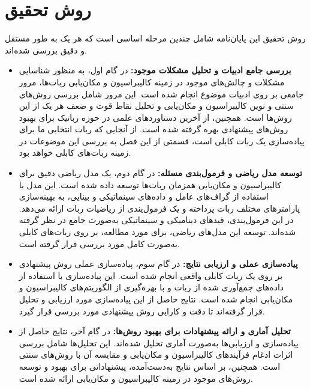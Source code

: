 \section{روش تحقیق}
 روش تحقیق این پایان‌نامه شامل چندین مرحله اساسی است که هر یک به طور مستقل و دقیق بررسی شده‌اند. 
\begin{itemize}
	
	\item \textbf{بررسی جامع ادبیات و تحلیل مشکلات موجود:} در گام اول، به منظور شناسایی مشکلات و چالش‌های موجود در زمینه کالیبراسیون و مکان‌یابی ربات‌ها، مرور جامعی بر روی ادبیات موضوع انجام شده است. این مرور شامل بررسی روش‌های سنتی و نوین کالیبراسیون و مکان‌یابی و تحلیل نقاط قوت و ضعف هر یک از این روش‌ها است. همچنین، از آخرین دستاوردهای علمی در حوزه رباتیک برای بهبود روش‌های پیشنهادی بهره گرفته شده است. از آنجایی که ربات انتخابی ما برای پیاده‌سازی یک ربات کابلی است، قسمتی از این فصل به بررسی این موضوعات در زمینه ربات‌های کابلی خواهد بود.
	
	\item \textbf{توسعه مدل ریاضی و فرمول‌بندی مسئله:}
در گام دوم، یک مدل ریاضی دقیق برای کالیبراسیون و مکان‌یابی همزمان ربات‌ها توسعه داده شده است. این مدل با استفاده از گراف‌های عامل و داده‌های سینماتیکی و بینایی، به بهینه‌سازی پارامترهای مختلف ربات پرداخته و یک فرمول‌یندی از ریاضیات ربات ارائه می‌دهد. در این فرمول‌بندی، قیدهای دینامیکی و سینماتیکی به‌صورت جامع در نظر گرفته شده‌اند. توسعه این مدل‌های ریاضی، برای مورد مطالعه، بر روی ربات‌های کابلی به‌صورت کامل مورد بررسی قرار گرفته است.
	
	\item \textbf{پیاده‌سازی عملی و ارزیابی نتایج:} در گام سوم، پیاده‌سازی عملی روش پیشنهادی بر روی یک ربات کابلی واقعی انجام شده است. این پیاده‌سازی با استفاده از داده‌های جمع‌آوری شده از ربات و با بهره‌گیری از الگوریتم‌های کالیبراسیون و مکان‌یابی انجام شده است. نتایج حاصل از این پیاده‌سازی مورد ارزیابی و تحلیل قرار گرفته‌اند تا دقت و کارایی روش پیشنهادی مورد بررسی قرار گیرد.
	
	\item \textbf{تحلیل آماری و ارائه پیشنهادات برای بهبود روش‌ها:} در گام آخر، نتایج حاصل از پیاده‌سازی و ارزیابی‌ها به‌صورت آماری تحلیل شده‌اند. این تحلیل‌ها شامل بررسی اثرات ادغام فرآیندهای کالیبراسیون و مکان‌یابی و مقایسه آن با روش‌های سنتی است. همچنین، بر اساس نتایج به‌دست‌آمده، پیشنهاداتی برای بهبود و توسعه روش‌های موجود در زمینه کالیبراسیون و مکان‌یابی ارائه شده است.
	
\end{itemize}


